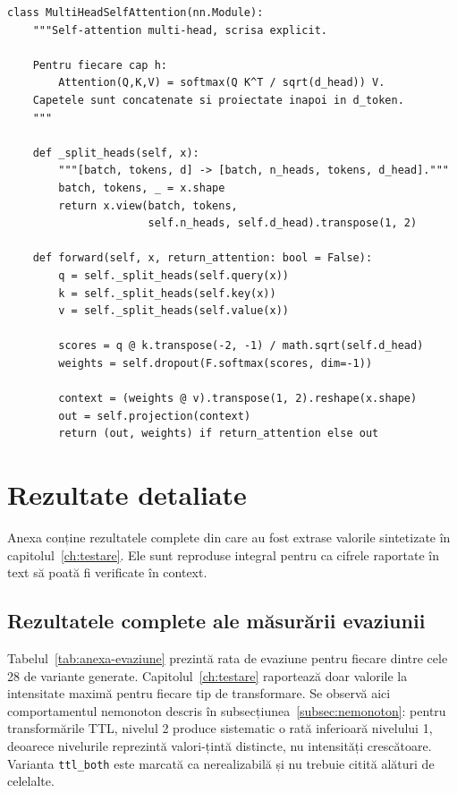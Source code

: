 \begin{verbatim}
class MultiHeadSelfAttention(nn.Module):
    """Self-attention multi-head, scrisa explicit.

    Pentru fiecare cap h:
        Attention(Q,K,V) = softmax(Q K^T / sqrt(d_head)) V.
    Capetele sunt concatenate si proiectate inapoi in d_token.
    """

    def _split_heads(self, x):
        """[batch, tokens, d] -> [batch, n_heads, tokens, d_head]."""
        batch, tokens, _ = x.shape
        return x.view(batch, tokens,
                      self.n_heads, self.d_head).transpose(1, 2)

    def forward(self, x, return_attention: bool = False):
        q = self._split_heads(self.query(x))
        k = self._split_heads(self.key(x))
        v = self._split_heads(self.value(x))

        scores = q @ k.transpose(-2, -1) / math.sqrt(self.d_head)
        weights = self.dropout(F.softmax(scores, dim=-1))

        context = (weights @ v).transpose(1, 2).reshape(x.shape)
        out = self.projection(context)
        return (out, weights) if return_attention else out
\end{verbatim}

\chapter{Rezultate detaliate}\label{ch:anexa-rezultate}

Anexa conține rezultatele complete din care au fost extrase valorile sintetizate în capitolul~\ref{ch:testare}. Ele sunt reproduse integral pentru ca cifrele raportate în text să poată fi verificate în context.

\section{Rezultatele complete ale măsurării evaziunii}\label{sec:anexa-evaziune}

Tabelul~\ref{tab:anexa-evaziune} prezintă rata de evaziune pentru fiecare dintre cele 28 de variante generate. Capitolul~\ref{ch:testare} raportează doar valorile la intensitate maximă pentru fiecare tip de transformare. Se observă aici comportamentul nemonoton descris în subsecțiunea~\ref{subsec:nemonoton}: pentru transformările TTL, nivelul 2 produce sistematic o rată inferioară nivelului 1, deoarece nivelurile reprezintă valori-țintă distincte, nu intensități crescătoare. Varianta \verb|ttl_both| este marcată ca nerealizabilă și nu trebuie citită alături de celelalte.

